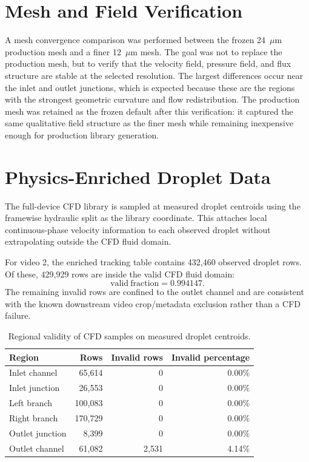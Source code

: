 \documentclass[11pt]{article}
\begin{document}
\section{Mesh and Field Verification}

A mesh convergence comparison was performed between the frozen 24~\(\mu\mathrm{m}\)
production mesh and a finer 12~\(\mu\mathrm{m}\) mesh. The goal was not to
replace the production mesh, but to verify that the velocity field, pressure
field, and flux structure are stable at the selected resolution. The largest
differences occur near the inlet and outlet junctions, which is expected because
these are the regions with the strongest geometric curvature and flow
redistribution.
The production mesh was retained as the frozen default after this verification:
it captured the same qualitative field structure as the finer mesh while
remaining inexpensive enough for production library generation.

\section{Physics-Enriched Droplet Data}

The full-device CFD library is sampled at measured droplet centroids using the
framewise hydraulic split as the library coordinate. This attaches local
continuous-phase velocity information to each observed droplet without
extrapolating outside the CFD fluid domain.

For video 2, the enriched tracking table contains 432,460 observed droplet rows.
Of these, 429,929 rows are inside the valid CFD fluid domain:
\[
\mathrm{valid~fraction} = 0.994147.
\]
The remaining invalid rows are confined to the outlet channel and are consistent
with the known downstream video crop/metadata exclusion rather than a CFD
failure.

\begin{table}[H]
\centering
\caption{Regional validity of CFD samples on measured droplet centroids.}
\label{tab:regional-validity}
\begin{tabular}{@{}lrrr@{}}
\toprule
Region & Rows & Invalid rows & Invalid percentage \\
\midrule
Inlet channel & 65,614 & 0 & 0.00\% \\
Inlet junction & 26,553 & 0 & 0.00\% \\
Left branch & 100,083 & 0 & 0.00\% \\
Right branch & 170,729 & 0 & 0.00\% \\
Outlet junction & 8,399 & 0 & 0.00\% \\
Outlet channel & 61,082 & 2,531 & 4.14\% \\
\bottomrule
\end{tabular}
\end{table}
\end{document}
